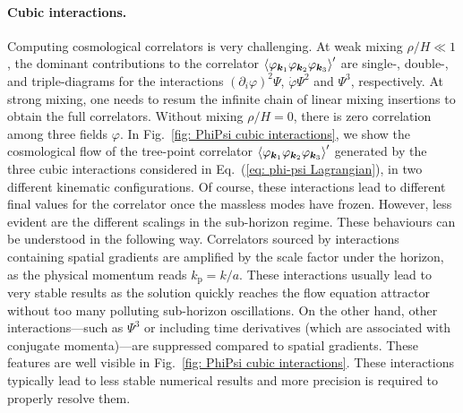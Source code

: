 \documentclass[11pt]{article}
\numberwithin{equation}{section} %
\begin{document}
\paragraph{Cubic interactions.} Computing cosmological correlators is very challenging. At weak mixing $\rho/H\ll 1$, the dominant contributions to the correlator $\braket{\varphi_{\bm{k}_1} \varphi_{\bm{k}_2} \varphi_{\bm{k}_3}}'$ are single-, double-, and triple-diagrams for the interactions $(\partial_i \varphi)^2\Psi$, $\dot{\varphi}\Psi^2$ and $\Psi^3$, respectively. At strong mixing, one needs to resum the infinite chain of linear mixing insertions to obtain the full correlators. Without mixing $\rho/H = 0$, there is zero correlation among three fields $\varphi$. In Fig.~\ref{fig: PhiPsi cubic interactions}, we show the cosmological flow of the tree-point correlator $\braket{\varphi_{\bm{k}_1} \varphi_{\bm{k}_2} \varphi_{\bm{k}_3}}'$ generated by the three cubic interactions considered in Eq.~(\ref{eq: phi-psi Lagrangian}), in two different kinematic configurations. Of course, these interactions lead to different final values for the correlator once the massless modes have frozen. However, less evident are the different scalings in the sub-horizon regime. These behaviours can be understood in the following way. Correlators sourced by interactions containing spatial gradients are amplified by the scale factor under the horizon, as the physical momentum reads $k_{\text{p}} = k/a$. These interactions usually lead to very stable results as the solution quickly reaches the flow equation attractor without too many polluting sub-horizon oscillations. On the other hand, other interactions---such as $\Psi^3$ or including time derivatives (which are associated with conjugate momenta)---are suppressed compared to spatial gradients. These features are well visible in Fig.~\ref{fig: PhiPsi cubic interactions}. These interactions typically lead to less stable numerical results and more precision is required to properly resolve them. 
\end{document}
